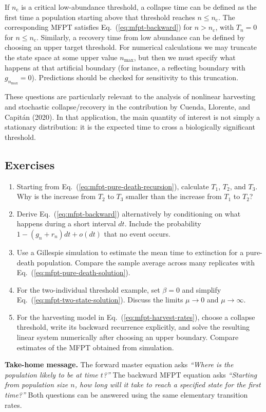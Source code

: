 If $n_{\mathrm c}$ is a critical low-abundance threshold, a collapse time
can be defined as the first time a population starting above that threshold
reaches $n\leq n_{\mathrm c}$. The corresponding MFPT satisfies
Eq.~(\ref{eq:mfpt-backward}) for $n>n_{\mathrm c}$, with
$T_n=0$ for $n\leq n_{\mathrm c}$. Similarly, a recovery time from low
abundance can be defined by choosing an upper target threshold.
For numerical calculations we may truncate the state space at some upper
value $n_{\max}$, but then we must specify what happens at that artificial
boundary (for instance, a reflecting boundary with $g_{n_{\max}}=0$).
Predictions should be checked for sensitivity to this truncation.

These questions are particularly relevant to the analysis of nonlinear
harvesting and stochastic collapse/recovery in the contribution by
Cuenda, Llorente, and Capit\'an (2020). In that application, the main
quantity of interest is not simply a stationary distribution: it is the
expected time to cross a biologically significant threshold.

\subsection{Exercises}
\begin{enumerate}
\item Starting from Eq.~(\ref{eq:mfpt-pure-death-recursion}), calculate
$T_1$, $T_2$, and $T_3$. Why is the increase from $T_2$ to $T_3$ smaller
than the increase from $T_1$ to $T_2$?
\item Derive Eq.~(\ref{eq:mfpt-backward}) alternatively by conditioning on
what happens during a short interval $dt$. Include the probability
$1-(g_n+r_n)dt+o(dt)$ that no event occurs.
\item Use a Gillespie simulation to estimate the mean time to extinction
for a pure-death population. Compare the sample average across many
replicates with Eq.~(\ref{eq:mfpt-pure-death-solution}).
\item For the two-individual threshold example, set $\beta=0$ and simplify
Eq.~(\ref{eq:mfpt-two-state-solution}). Discuss the limits $\mu\to0$ and
$\mu\to\infty$.
\item For the harvesting model in Eq.~(\ref{eq:mfpt-harvest-rates}),
choose a collapse threshold, write its backward recurrence explicitly,
and solve the resulting linear system numerically after choosing an
upper boundary. Compare estimates of the MFPT obtained from simulation.
\end{enumerate}

\medskip
\noindent\textbf{Take-home message.} The forward master equation asks
\emph{``Where is the population likely to be at time $t$?''} The backward
MFPT equation asks \emph{``Starting from population size $n$, how long
will it take to reach a specified state for the first time?''} Both
questions can be answered using the same elementary transition rates.
